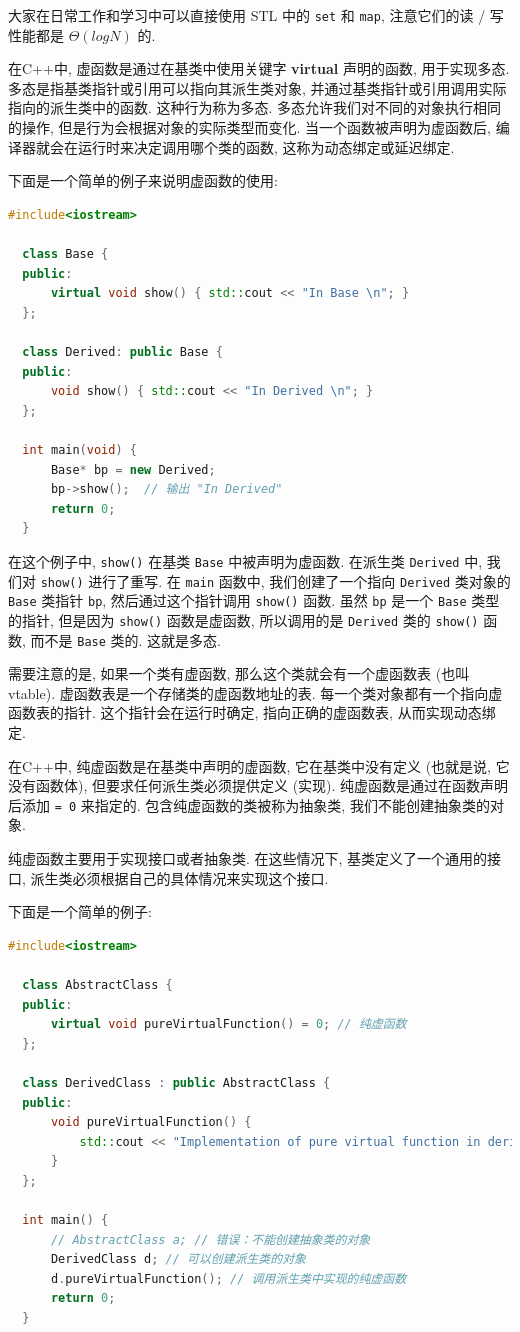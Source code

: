 \documentclass[a4paper]{ctexart}
\theoremstyle{definition}
\theoremstyle{definition}
\begin{document}
大家在日常工作和学习中可以直接使用 STL 中的 \verb|set| 和 \verb|map|,
注意它们的读 / 写性能都是 $\Theta(log N)$ 的.

在C++中, 虚函数是通过在基类中使用关键字 {\bfseries virtual} 声明的函数, 用于实现多态. 
多态是指基类指针或引用可以指向其派生类对象, 并通过基类指针或引用调用实际指向的派生类中的函数. 
这种行为称为多态. 多态允许我们对不同的对象执行相同的操作, 但是行为会根据对象的实际类型而变化.
当一个函数被声明为虚函数后, 编译器就会在运行时来决定调用哪个类的函数, 这称为动态绑定或延迟绑定. 

下面是一个简单的例子来说明虚函数的使用:
\begin{lstlisting}[language=c++]
  #include<iostream>  
  
  class Base {  
  public:  
      virtual void show() { std::cout << "In Base \n"; }  
  };  
    
  class Derived: public Base {  
  public:  
      void show() { std::cout << "In Derived \n"; }  
  };  
    
  int main(void) {   
      Base* bp = new Derived;  
      bp->show();  // 输出 "In Derived"  
      return 0;  
  }      
\end{lstlisting}

在这个例子中, \verb|show()| 在基类 \verb|Base| 中被声明为虚函数. 
在派生类 \verb|Derived| 中, 我们对 \verb|show()| 进行了重写. 在 \verb|main| 函数中, 
我们创建了一个指向 \verb|Derived| 类对象的 \verb|Base| 类指针 \verb|bp|, 
然后通过这个指针调用 \verb|show()| 函数. 虽然 \verb|bp| 是一个 \verb|Base| 类型的指针, 
但是因为 \verb|show()| 函数是虚函数, 所以调用的是 \verb|Derived| 类的 \verb|show()| 函数, 
而不是 \verb|Base| 类的. 这就是多态. 

需要注意的是, 如果一个类有虚函数, 那么这个类就会有一个虚函数表 (也叫 vtable). 
虚函数表是一个存储类的虚函数地址的表. 每一个类对象都有一个指向虚函数表的指针. 这个指针会在运行时确定, 
指向正确的虚函数表, 从而实现动态绑定. 

在C++中, 纯虚函数是在基类中声明的虚函数, 它在基类中没有定义 (也就是说, 它没有函数体), 
但要求任何派生类必须提供定义 (实现). 纯虚函数是通过在函数声明后添加 \verb|= 0| 来指定的. 
包含纯虚函数的类被称为抽象类, 我们不能创建抽象类的对象.

纯虚函数主要用于实现接口或者抽象类. 在这些情况下, 基类定义了一个通用的接口, 派生类必须根据自己的具体情况来实现这个接口.

下面是一个简单的例子:

\begin{lstlisting}[language=c++]
  #include<iostream>

  class AbstractClass {
  public:
      virtual void pureVirtualFunction() = 0; // 纯虚函数
  };
  
  class DerivedClass : public AbstractClass {
  public:
      void pureVirtualFunction() {
          std::cout << "Implementation of pure virtual function in derived class." << std::endl;
      }
  };
  
  int main() {
      // AbstractClass a; // 错误：不能创建抽象类的对象
      DerivedClass d; // 可以创建派生类的对象
      d.pureVirtualFunction(); // 调用派生类中实现的纯虚函数
      return 0;
  }    
\end{lstlisting}
\end{document}
